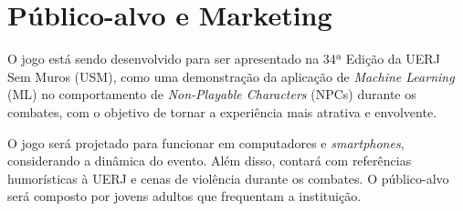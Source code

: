 \section{Público-alvo e Marketing}
O jogo está sendo desenvolvido para ser apresentado na
34ª Edição da UERJ Sem Muros (USM), como uma demonstração
da aplicação de \textit{Machine Learning} (ML) no
comportamento de \textit{Non-Playable Characters} (NPCs)
durante os combates, com o objetivo de tornar a 
experiência mais atrativa e envolvente.

O jogo será projetado para funcionar em 
computadores e \textit{smartphones}, considerando a 
dinâmica do evento. Além disso, contará com referências 
humorísticas à UERJ e cenas de violência durante os 
combates. O público-alvo será composto por jovens adultos
que frequentam a instituição.